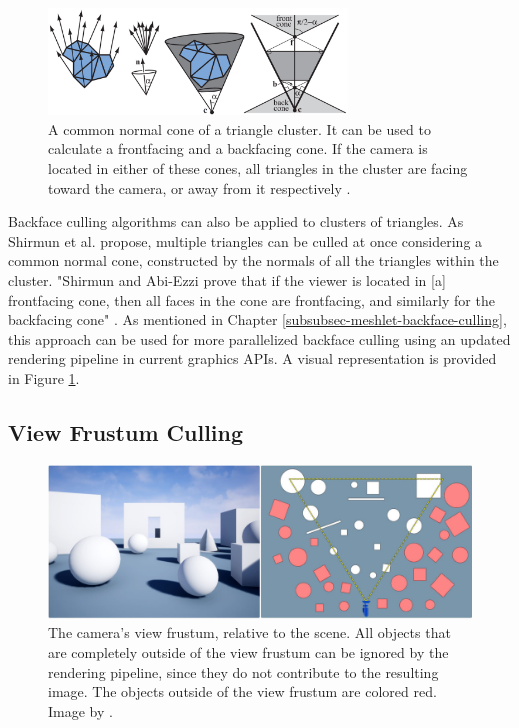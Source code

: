 \begin{figure}[h]
    \centering
    \includegraphics[width=300px]{images/graphics/cluster-backface-culling.jpg}
    \caption{A common normal cone of a triangle cluster. It can be used to calculate a frontfacing
    and a backfacing cone. If the camera is located in either of these cones, all triangles in the 
    cluster are facing toward the camera, or away from it respectively \cite{AkenineMoeller2018}.}
    \label{fig:cluster-backface-culling}
\end{figure}

\noindent 
Backface culling algorithms can also be applied to clusters of triangles. As Shirmun et al. \cite{Shirmun1993} 
propose, multiple triangles can be culled at once considering a common normal cone, constructed by the normals 
of all the triangles within the cluster. "Shirmun and Abi-Ezzi \cite{Shirmun1993} prove that if the viewer is 
located in [a] frontfacing cone, then all faces in the cone are frontfacing, and similarly for the backfacing 
cone" \cite{AkenineMoeller2018}. As mentioned in Chapter \ref{subsubsec-meshlet-backface-culling}, this approach 
can be used for more parallelized backface culling using an updated rendering pipeline in current graphics 
\ac{API}s. A visual representation is provided in Figure \ref{fig:cluster-backface-culling}.


\subsection*{View Frustum Culling} \label{subsec-view-frustum-culling}

\begin{figure}[h]
    \centering
    \includegraphics[width=\linewidth]{images/graphics/view-frustum-culling.jpg}
    \caption{The camera's view frustum, relative to the scene. All objects that are completely outside of 
    the view frustum can be ignored by the rendering pipeline, since they do not contribute to the resulting image.
    The objects outside of the view frustum are colored red. Image by \cite{Pan2020}.}
    \label{fig:view-frustum-culling}
\end{figure}

